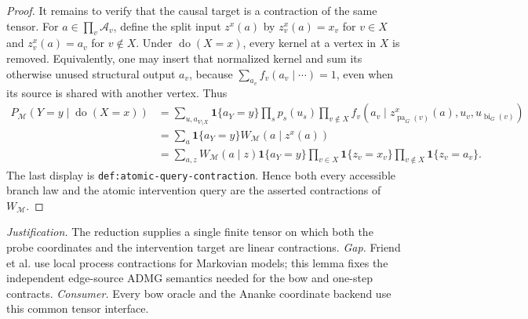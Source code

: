 \documentclass{article}
\begin{document}
\begin{proof}
It remains to verify that the causal target is a contraction of the same tensor.  For \(a\in\prod_v\mathcal A_v\), define the split input \(z^{x}(a)\) by \(z^{x}_v(a)=x_v\) for \(v\in X\) and \(z^{x}_v(a)=a_v\) for \(v\notin X\).  Under \(\operatorname{do}(X=x)\), every kernel at a vertex in \(X\) is removed.  Equivalently, one may insert that normalized kernel and sum its otherwise unused structural output \(a_v\), because \(\sum_{a_v}f_v(a_v\mid\cdots)=1\), even when its source is shared with another vertex.  Thus
\[
\begin{aligned}
 P_{\mathcal M}(Y=y\mid\operatorname{do}(X=x))
 &=\sum_{u,a_{V\setminus X}}\mathbf 1\{a_Y=y\}
 \prod_s p_s(u_s)\prod_{v\notin X}
 f_v\!\left(a_v\mid z^x_{\operatorname{pa}_G(v)}(a),
 u_v,u_{\operatorname{bi}_G(v)}\right)\\
 &=\sum_a\mathbf 1\{a_Y=y\}
 W_{\mathcal M}\!\left(a\mid z^x(a)\right)\\
 &=\sum_{a,z}W_{\mathcal M}(a\mid z)\mathbf 1\{a_Y=y\}
 \prod_{v\in X}\mathbf 1\{z_v=x_v\}
 \prod_{v\notin X}\mathbf 1\{z_v=a_v\}.
\end{aligned}
\]
The last display is \texttt{def:atomic-query-contraction}.  Hence both every accessible branch law and the atomic intervention query are the asserted contractions of \(W_{\mathcal M}\).
\end{proof}
\par\smallskip\noindent \textit{Justification.} The reduction supplies a single finite tensor on which both the probe coordinates and the intervention target are linear contractions. \textit{Gap.} Friend et al. use local process contractions for Markovian models; this lemma fixes the independent edge-source ADMG semantics needed for the bow and one-step contracts. \textit{Consumer.} Every bow oracle and the Ananke coordinate backend use this common tensor interface.
\end{document}
